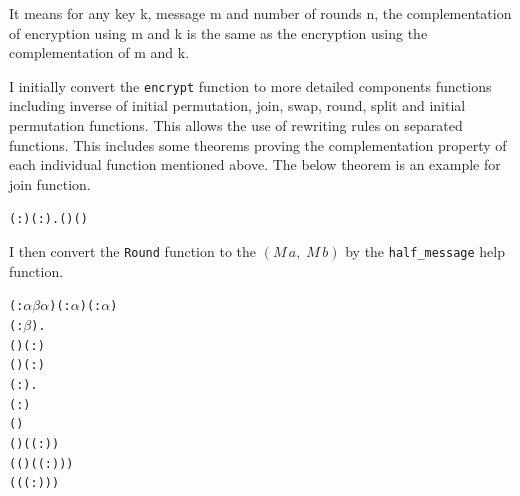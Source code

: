 \documentclass{article}
\begin{document}
It means for any key k, message m and number of rounds n, the complementation of encryption using m and k is the
same as the encryption using the complementation of m and k.

I initially convert the \verb|encrypt| function to more detailed components functions including inverse of initial permutation,
join, swap, round, split and initial permutation functions. This allows the use of rewriting rules on separated
functions. This includes some theorems proving the complementation property of each individual function mentioned above.
The below theorem is an example for join function.

\begin{alltt}
\HOLTokenTurnstile{} \HOLSymConst{\HOLTokenForall{}}( :) ( :).  (\HOLSymConst{\HOLTokenNeg{}}\HOLSymConst{,}\HOLSymConst{\HOLTokenNeg{}}) \HOLSymConst{=} \HOLSymConst{\HOLTokenNeg{}} (\HOLSymConst{,})
\end{alltt}

I then convert the \verb|Round| function to the $(M \,a,\; M \,b)$ by the \verb|half_message| help function.

\begin{alltt}
\HOLTokenTurnstile{} \HOLSymConst{\HOLTokenForall{}}( :\ensuremath{\alpha}  \HOLTokenMap{} \ensuremath{\beta} \HOLTokenMap{} \ensuremath{\alpha} ) ( :\ensuremath{\alpha} ) ( :\ensuremath{\alpha} )
       ( :\ensuremath{\beta} ).
       (\HOLSymConst{,})  ( :) \HOLSymConst{=}  \HOLSymConst{\HOLTokenConj{}}
       (\HOLSymConst{,})  ( :) \HOLSymConst{=}  \HOLSymConst{\HOLTokenConj{}}
     \HOLSymConst{\HOLTokenForall{}}( :).
       ( :) \HOLSymConst{\HOLTokenLeq{}}  \HOLSymConst{\HOLTokenImp{}}
         (\HOLSymConst{,})   \HOLSymConst{=}
         (\HOLSymConst{,})  ( \HOLSymConst{\ensuremath{-}} ( :)) \HOLSymConst{\HOLTokenEor{}}
        (  (\HOLSymConst{,})  ( \HOLSymConst{\ensuremath{-}} ( :)))
         ( ( \HOLSymConst{\ensuremath{-}} ( :)) )
\end{alltt}
\end{document}
